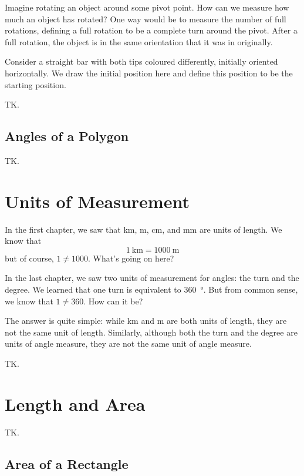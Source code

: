 \documentclass[a4paper,10pt]{report}
\begin{document}
Imagine rotating an object around some pivot point. How can we measure how much
an object has rotated? One way would be to measure the number of full rotations,
defining a full rotation to be a complete turn around the pivot. After a full
rotation, the object is in the same orientation that it was in originally.

Consider a straight bar with both tips coloured differently, initially oriented
horizontally. We draw the initial position here and define this position to be
the starting position.

TK.

\section{Angles of a Polygon}

TK.

\chapter{Units of Measurement}

In the first chapter, we saw that \si{\kilo\metre}, \si{\metre},
\si{\centi\metre}, and \si{\milli\metre} are units of length. We know that \[
  \SI{1}{\kilo\metre} = \SI{1000}{\metre}
\] but of course, \(1\ne1000\). What's going on here?

In the last chapter, we saw two units of measurement for angles: the turn and
the degree. We learned that one turn is equivalent to \SI{360}{\degree}. But
from common sense, we know that \(1 \ne 360\). How can it be?

The answer is quite simple: while \si{\kilo\metre} and \si{\metre} are both
units of length, they are not the same unit of length. Similarly, although both
the turn and the degree are units of angle measure, they are not the same unit
of angle measure.

TK.

\chapter{Length and Area}

TK.

\section{Area of a Rectangle}
\end{document}
